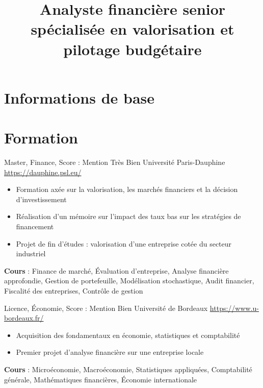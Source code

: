 \documentclass[a4paper, serif, 10pt]{moderncv}
\title{Analyste financière senior spécialisée en valorisation et pilotage budgétaire}
\begin{document}
\maketitle

\section{Informations de base}

\section{Formation}

        {Master, Finance, Score : Mention Très Bien}
        {Université Paris-Dauphine}
        {\url{https://dauphine.psl.eu/}}
        {}
        {\begin{itemize}
\item Formation axée sur la valorisation, les marchés financiers et la décision d'investissement
\item Réalisation d'un mémoire sur l'impact des taux bas sur les stratégies de financement
\item Projet de fin d'études : valorisation d'une entreprise cotée du secteur industriel
\end{itemize}
\textbf{Cours} : Finance de marché, Évaluation d'entreprise, Analyse financière approfondie, Gestion de portefeuille, Modélisation stochastique, Audit financier, Fiscalité des entreprises, Contrôle de gestion}

        {Licence, Économie, Score : Mention Bien}
        {Université de Bordeaux}
        {\url{https://www.u-bordeaux.fr/}}
        {}
        {\begin{itemize}
\item Acquisition des fondamentaux en économie, statistiques et comptabilité
\item Premier projet d'analyse financière sur une entreprise locale
\end{itemize}
\textbf{Cours} : Microéconomie, Macroéconomie, Statistiques appliquées, Comptabilité générale, Mathématiques financières, Économie internationale}
\end{document}
